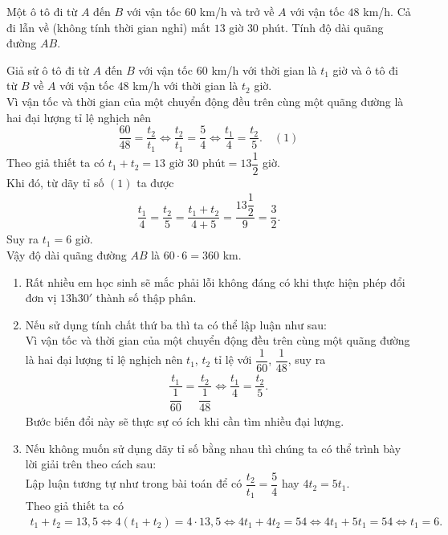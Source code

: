 \begin{vd}
	Một ô tô đi từ $A$ đến $B$ với vận tốc $60$ km/h và trở về $A$ với vận tốc $48$ km/h. Cả đi lẫn về (không tính thời gian nghỉ) mất $13$ giờ $30$ phút. Tính độ dài quãng đường $AB$.
	\loigiai
	{
		Giả sử ô tô đi từ $A$ đến $B$ với vận tốc $60$ km/h với thời gian là $t_1$ giờ và ô tô đi từ $B$ về $A$ với vận tốc $48$ km/h với thời gian là $t_2$ giờ.\\
		Vì vận tốc và thời gian của một chuyển động đều trên cùng một quãng đường là hai đại lượng tỉ lệ nghịch nên
		$$	\dfrac{60}{48} = \dfrac{t_2}{t_1} \Leftrightarrow \dfrac{t_2}{t_1}=\dfrac{5}{4} \Leftrightarrow \dfrac{t_1}{4} = \dfrac{t_2}{5}. \quad (1)	$$
		Theo giả thiết ta có $t_1+t_2=13 \text{ giờ }30 \text{ phút}=13\dfrac{1}{2}$ giờ.\\
		Khi đó, từ dãy tỉ số $ (1) $ ta được
		\begin{eqnarray*}
			\dfrac{t_1}{4} = \dfrac{t_2}{5} = \dfrac{t_1+t_2}{4+5} = \dfrac{13\dfrac{1}{2}}{9} = \dfrac{3}{2}.
		\end{eqnarray*}
		Suy ra $t_1=6$ giờ.\\
		Vậy độ dài quãng đường $AB$ là $60 \cdot 6 = 360$ km.
		\begin{note}\textrm{}
			\begin{enumerate}
				\item Rất nhiều em học sinh sẽ mắc phải lỗi không đáng có khi thực hiện phép đổi đơn vị $13\mathrm{h}30'$ thành số thập phân.
				\item Nếu sử dụng tính chất thứ ba thì ta có thể lập luận như sau:\\
				Vì vận tốc và thời gian của một chuyển động đều trên cùng một quãng đường là hai đại lượng tỉ lệ nghịch nên $t_1$, $t_2$ tỉ lệ với $\dfrac{1}{60}$, $\dfrac{1}{48}$, suy ra
				\begin{eqnarray*}
					\dfrac{t_1}{\dfrac{1}{60}} = \dfrac{t_2}{\dfrac{1}{48}} \Leftrightarrow \dfrac{t_1}{4} = \dfrac{t_2}{5}.
				\end{eqnarray*}
				Bước biến đổi này sẽ thực sự có ích khi cần tìm nhiều đại lượng.
				\item Nếu không muốn sử dụng dãy tỉ số bằng nhau thì chúng ta có thể trình bày lời giải trên theo cách sau:\\
				Lập luận tương tự như trong bài toán để có $\dfrac{t_2}{t_1} = \dfrac{5}{4}$ hay $4t_2=5t_1$.\\
				Theo giả thiết ta có
				\begin{eqnarray*}
					t_1+t_2=13{,}5 \Leftrightarrow 4(t_1+t_2) = 4 \cdot 13{,}5 \Leftrightarrow 4t_1+4t_2=54 \Leftrightarrow 4t_1+5t_1=54 \Leftrightarrow t_1=6.

\end{eqnarray*}
\end{enumerate}
\end{note}}
\end{vd}
